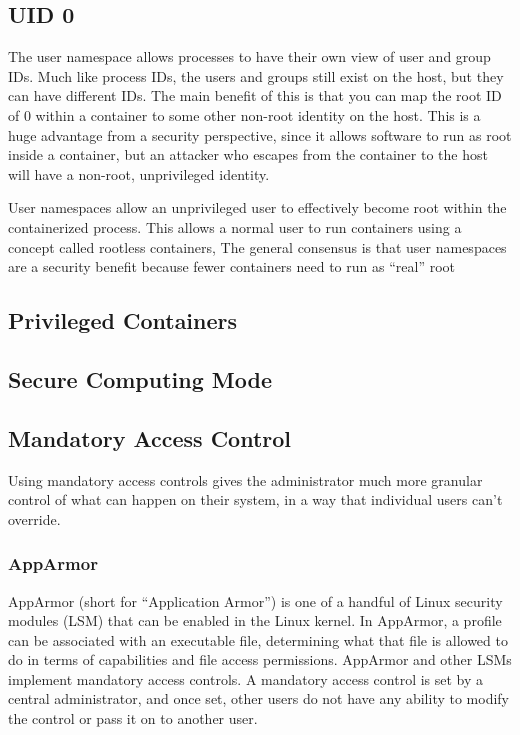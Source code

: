 \subsection{UID 0}
\label{ssec::security:uid0}

The user namespace allows processes to have their own view of user and group IDs. Much like process IDs, the users and groups still exist on the host, but they can have different IDs. The main benefit of this is that you can map the root ID of 0 within a container to some other non-root identity on the host. This is a huge advantage from a security perspective, since it allows software to run as root inside a container, but an attacker who escapes from the container to the host will have a non-root, unprivileged identity.

User namespaces allow an unprivileged user to effectively become root within the
containerized process. This allows a normal user to run containers using a concept called rootless containers, The general consensus is that user namespaces are a security benefit because fewer containers need to run as “real” root

\subsection{Privileged Containers}
\label{ssec::security:priv-cont}


\subsection{Secure Computing Mode}
\label{ssec::security:sec-compt}

\subsection{Mandatory Access Control}
\label{ssec::security:sel-apparm}

Using mandatory access controls gives the administrator much more granular control of what can happen on their system, in a way that individual users can't override.

\subsubsection{\textbf{AppArmor}}
AppArmor (short for “Application Armor”) is one of a handful of Linux security
modules (LSM) that can be enabled in the Linux kernel. In AppArmor, a profile can be associated with an executable file, determining what that file is allowed to do in terms of capabilities and file access permissions. AppArmor and other LSMs implement mandatory access controls. A mandatory access control is set by a central administrator, and once set, other users do not have any ability to modify the control or pass it on to another user.

